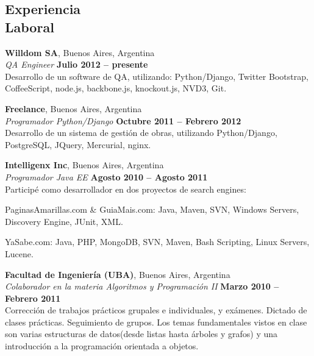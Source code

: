 \documentclass[margin,line]{resume}
\begin{document}
\begin{resume}
    \section{\mysidestyle Experiencia\\Laboral}

    \textbf{Willdom SA}, Buenos Aires, Argentina \vspace{2mm}\\\vspace{1mm}%
    \textsl{QA Engineer} \hfill \textbf{Julio 2012 -- presente}\vspace{1.5mm}\\\vspace{0mm}%
	Desarrollo de un software de QA, utilizando: Python/Django, Twitter Bootstrap, CoffeeScript, node.js, backbone.js, knockout.js, NVD3, Git. 

    \textbf{Freelance}, Buenos Aires, Argentina \vspace{2mm}\\\vspace{1mm}%
    \textsl{Programador Python/Django} \hfill \textbf{Octubre 2011 -- Febrero 2012}\vspace{1.5mm}\\\vspace{0mm}%
	Desarrollo de un sistema de gestión de obras, utilizando Python/Django, PostgreSQL, JQuery, Mercurial, nginx.

    \textbf{Intelligenx Inc}, Buenos Aires, Argentina \vspace{2mm}\\\vspace{1mm}%
    \textsl{Programador Java EE} \hfill \textbf{Agosto 2010 -- Agosto 2011}\\
	Participé como desarrollador en dos proyectos de search engines:
    \begin{list2}
        \item PaginasAmarillas.com \& GuiaMais.com: Java, Maven, SVN, Windows Servers, Discovery Engine, JUnit, XML.
        \item YaSabe.com: Java, PHP, MongoDB, SVN, Maven, Bash Scripting, Linux Servers, Lucene. 
    \end{list2}\vspace{-1.5mm}	

    \textbf{Facultad de Ingeniería (UBA)}, Buenos Aires, Argentina \vspace{2mm}\\\vspace{1mm}%
    \textsl{Colaborador en la materia Algoritmos y Programación II} \hfill \textbf{Marzo 2010 -- Febrero 2011}\vspace{1.5mm}\\\vspace{0mm}%
	Corrección de trabajos prácticos grupales e individuales, y exámenes. Dictado de clases prácticas. Seguimiento de grupos. Los temas fundamentales vistos en clase son varias estructuras de datos(desde listas hasta árboles y grafos) y una introducción a la programación orientada a objetos.


\end{resume}
\end{document}
